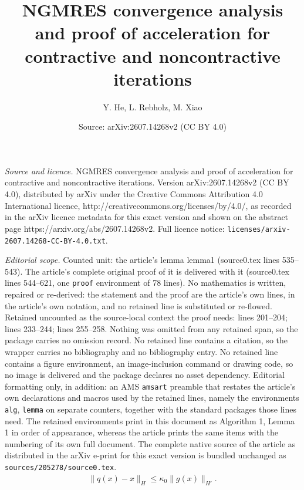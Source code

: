 \documentclass[10pt,a4paper]{amsart}
\title{NGMRES convergence analysis and proof of acceleration for contractive and noncontractive iterations}
\author{Y. He, L. Rebholz, M. Xiao}
\date{Source: arXiv:2607.14268v2 (CC BY 4.0)}
\begin{document}
\maketitle

\noindent\emph{Source and licence.} NGMRES convergence analysis and proof of acceleration for contractive and noncontractive iterations. Version arXiv:2607.14268v2 (CC BY 4.0), distributed by arXiv under the Creative Commons Attribution 4.0 International licence, http://creativecommons.org/licenses/by/4.0/, as recorded in the arXiv licence metadata for this exact version and shown on the abstract page https://arxiv.org/abs/2607.14268v2. Full licence notice: \texttt{licenses/arxiv-2607.14268-CC-BY-4.0.txt}.\par\smallskip

\noindent\textit{Editorial scope.} Counted unit: the article's lemma lemma1 (source0.tex lines 535--543). The article's complete original proof of it is delivered with it (source0.tex lines 544--621, one \texttt{proof} environment of 78 lines). No mathematics is written, repaired or re-derived: the statement and the proof are the article's own lines, in the article's own notation, and no retained line is substituted or re-flowed.  Retained uncounted as the source-local context the proof needs: lines 201--204; lines 233--244; lines 255--258.  Nothing was omitted from any retained span, so the package carries no omission record.  No retained line contains a citation, so the wrapper carries no bibliography and no bibliography entry.  No retained line contains a figure environment, an image-inclusion command or drawing code, so no image is delivered and the package declares no asset dependency.  Editorial formatting only, in addition: an AMS \texttt{amsart} preamble that restates the article's own declarations and macros used by the retained lines, namely the environments \texttt{alg}, \texttt{lemma} on separate counters, together with the standard packages those lines need.  The retained environments print in this document as Algorithm 1, Lemma 1 in order of appearance, whereas the article prints the same items with the numbering of its own full document.  The complete native source of the article as distributed in the arXiv e-print for this exact version is bundled unchanged as \texttt{sources/205278/source0.tex}.
    \begin{align}
    \label{qbd1}
         \|  q(x) - x \|_{H} \le \kappa_0 \| g(x)\|_{H'}.
    \end{align}
\end{document}
